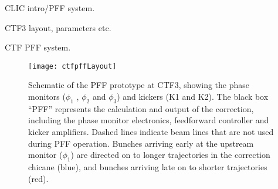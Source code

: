 CLIC intro/PFF system.

CTF3 layout, parameters etc.

CTF PFF system.

\begin{figure}
  \texttt{[image: ctfpffLayout]}%
  \caption{\label{f:pffLayout}Schematic of the PFF prototype at CTF3, 
  showing the phase monitors (\(\phi_1\) , 
  \(\phi_2\) and \(\phi_3\)) and kickers (K1 and K2). The black box “PFF” 
  represents the calculation and output of the correction, including the 
  phase monitor electronics, feedforward controller and kicker amplifiers.
  Dashed lines indicate beam lines that are not used during PFF operation. 
  Bunches arriving early at the upstream monitor (\(\phi_1\)) are directed 
  on to longer trajectories in the correction chicane (blue), and bunches 
  arriving late on to shorter trajectories (red).
    }
\end{figure}


